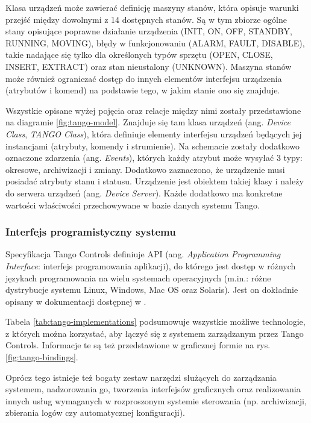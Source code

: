 Klasa urządzeń może zawierać definicję maszyny stanów, która opisuje warunki przejść między dowolnymi z 14 dostępnych stanów. Są w tym zbiorze ogólne stany opisujące poprawne działanie urządzenia (INIT, ON, OFF, STANDBY, RUNNING, MOVING), błędy w funkcjonowaniu (ALARM, FAULT, DISABLE), takie nadające się tylko dla określonych typów sprzętu (OPEN, CLOSE, INSERT, EXTRACT) oraz stan nieustalony (UNKNOWN). Maszyna stanów może również ograniczać dostęp do innych elementów interfejsu urządzenia (atrybutów i komend) na podstawie tego, w jakim stanie ono się znajduje.

Wszystkie opisane wyżej pojęcia oraz relacje między nimi zostały przedstawione na diagramie \ref{fig:tango-model}. Znajduje się tam klasa urządzeń (ang. \emph{Device Class}, \emph{TANGO Class}), która definiuje elementy interfejsu urządzeń będących jej instancjami (atrybuty, komendy i strumienie).
Na schemacie zostały dodatkowo oznaczone zdarzenia (ang. \emph{Events}), których każdy atrybut może wysyłać 3 typy: okresowe, archiwizacji i zmiany. Dodatkowo zaznaczono, że urządzenie musi posiadać atrybuty stanu i statusu.
Urządzenie jest obiektem takiej klasy i należy do serwera urządzeń (ang. \emph{Device Server}). Każde dodatkowo ma konkretne wartości właściwości przechowywane w bazie danych systemu Tango.

\subsubsection{Interfejs programistyczny systemu}
Specyfikacja Tango Controls definiuje API (ang. \emph{Application Programming Interface}: interfejs programowania aplikacji), do którego jest dostęp w różnych językach programowania na wielu systemach operacyjnych (m.in.: różne dystrybucje systemu Linux, Windows, Mac OS oraz Solaris). Jest on dokładnie opisany w dokumentacji dostępnej w \cite{TangoDocs}.

Tabela \ref{tab:tango-implementations} podsumowuje wszystkie możliwe technologie, z których można korzystać, aby łączyć się z systemem zarządzanym przez Tango Controls. Informacje te są też przedstawione w graficznej formie na rys. \ref{fig:tango-bindings}.

Oprócz tego istnieje też bogaty zestaw narzędzi służących do zarządzania systemem, nadzorowania go, tworzenia interfejsów graficznych oraz realizowania innych usług wymaganych w rozproszonym systemie sterowania (np. archiwizacji, zbierania logów czy automatycznej konfiguracji).

